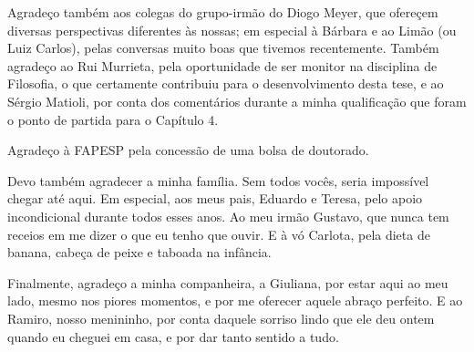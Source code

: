 Agradeço também aos colegas do grupo-irmão do Diogo Meyer, que ofereçem diversas perspectivas diferentes às nossas; em especial à Bárbara e ao Limão (ou Luiz Carlos), pelas conversas muito boas que tivemos recentemente. Também agradeço ao Rui Murrieta, pela oportunidade de ser monitor na disciplina de Filosofia, o que certamente contribuiu para o desenvolvimento desta tese, e ao Sérgio Matioli, por conta dos comentários durante a minha qualificação que foram o ponto de partida para o Capítulo 4. 

Agradeço à FAPESP pela concessão de uma bolsa de doutorado.

Devo também agradecer a minha família. 
Sem todos vocês, seria impossível chegar até aqui. 
Em especial, aos meus pais, Eduardo e Teresa, pelo apoio incondicional durante todos esses anos.
Ao meu irmão Gustavo, que nunca tem receios em me dizer o que eu tenho que ouvir.
E à vó Carlota, pela dieta de banana, cabeça de peixe e taboada na infância.

Finalmente, agradeço a minha companheira, a Giuliana, por estar aqui ao meu lado, mesmo nos piores momentos, e por me oferecer aquele abraço perfeito.
E ao Ramiro, nosso menininho, por conta daquele sorriso lindo que ele deu ontem quando eu cheguei em casa, e por dar tanto sentido a tudo.

\singlespacing